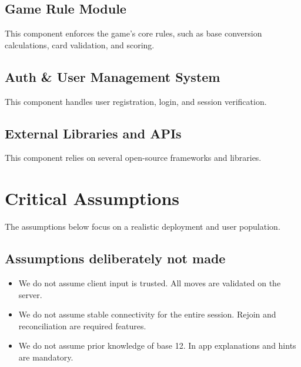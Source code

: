 \documentclass{article}
\begin{document}
\subsection{Game Rule Module}
This component enforces the game's core rules, such as base conversion calculations, card validation, and scoring.
\subsection{Auth \& User Management System}
This component handles user registration, login, and session verification.
\subsection{External Libraries and APIs}
This component relies on several open-source frameworks and libraries.

\section{Critical Assumptions}

The assumptions below focus on a realistic deployment and user population. 
\subsection*{Assumptions deliberately not made}
\begin{itemize}
  \item We do not assume client input is trusted. All moves are validated on the server.
  \item We do not assume stable connectivity for the entire session. Rejoin and reconciliation are required features.
  \item We do not assume prior knowledge of base 12. In app explanations and hints are mandatory.
\end{itemize}
\end{document}
